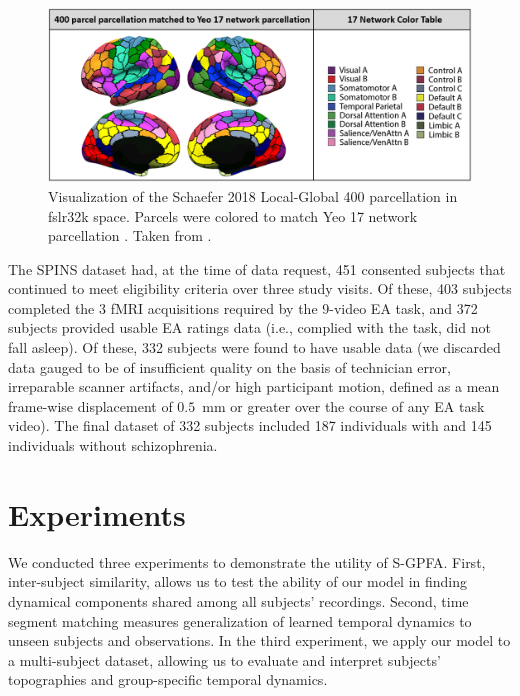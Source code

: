 \begin{figure}[h]
    \centering
    \includegraphics[width=0.65\linewidth]{figs/ch1/Schaefer2018_400.png}
    \caption{Visualization of the Schaefer 2018 Local-Global 400 parcellation in fslr32k space. Parcels were colored to match Yeo 17 network parcellation \cite{yeo}. Taken from \cite{schaefer2018local}.}\label{ch1:fig:schaefer}
\end{figure}

The SPINS dataset had, at the time of data request, 451 consented subjects that continued to meet eligibility criteria over three study visits. Of these, 403  subjects completed the 3 fMRI acquisitions required by the 9-video EA task, and 372 subjects provided usable EA ratings data (i.e., complied with the task, did not fall asleep). Of these, 332 subjects were found to have usable data (we discarded data gauged to be of insufficient quality on the basis of technician error, irreparable scanner artifacts, and/or high participant motion, defined as a mean frame-wise displacement of $0.5$~mm or greater over the course of any EA task video). The final dataset of 332 subjects included 187 individuals with and 145 individuals without schizophrenia.

\section{Experiments}
\label{ch1:sec:experiments}

We conducted three experiments to demonstrate the utility of S-GPFA. First, inter-subject similarity, allows us to test the ability of our model in finding dynamical components shared among all subjects' recordings. Second, time segment matching measures generalization of learned temporal dynamics to unseen subjects and observations. In the third experiment, we apply our model to a multi-subject dataset, allowing us to evaluate and interpret subjects' topographies and group-specific temporal dynamics.


